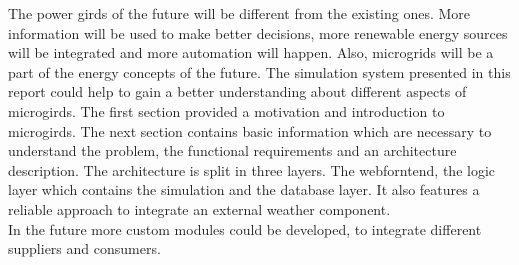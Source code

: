 The power girds of the future will be different from the existing ones. More information will be used to make better decisions, more renewable energy sources will be integrated and more automation will happen. Also, microgrids will be a part of the energy concepts of the future. The simulation system presented in this report could help to gain a better understanding about different aspects of microgirds. The first section provided a motivation and introduction to microgirds. The next section contains basic information which are necessary to understand the problem, the functional requirements and an architecture description. The architecture is split in three layers. The webforntend, the logic layer which contains the simulation and the database layer. It also features a reliable approach to integrate an external weather component.\\

In the future more custom modules could be developed, to integrate different suppliers and consumers.

